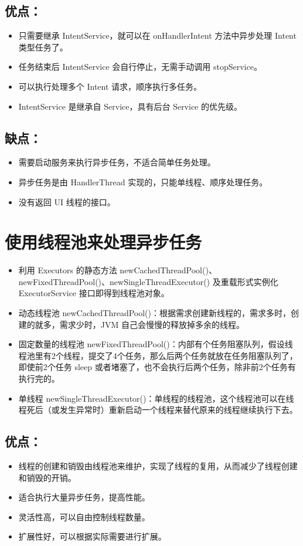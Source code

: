\documentclass[9pt, b5paper]{article}
\begin{document}
\subsection{优点：}
\label{sec-5-1}
\begin{itemize}
\item 只需要继承 IntentService，就可以在 onHandlerIntent 方法中异步处理 Intent 类型任务了。
\item 任务结束后 IntentService 会自行停止，无需手动调用 stopService。
\item 可以执行处理多个 Intent 请求，顺序执行多任务。
\item IntentService 是继承自 Service，具有后台 Service 的优先级。
\end{itemize}
\subsection{缺点：}
\label{sec-5-2}
\begin{itemize}
\item 需要启动服务来执行异步任务，不适合简单任务处理。
\item 异步任务是由 HandlerThread 实现的，只能单线程、顺序处理任务。
\item 没有返回 UI 线程的接口。
\end{itemize}

\section{使用线程池来处理异步任务}
\label{sec-6}
\begin{itemize}
\item 利用 Executors 的静态方法 newCachedThreadPool()、newFixedThreadPool()、newSingleThreadExecutor() 及重载形式实例化 ExecutorService 接口即得到线程池对象。
\item 动态线程池 newCachedThreadPool()：根据需求创建新线程的，需求多时，创建的就多，需求少时，JVM 自己会慢慢的释放掉多余的线程。
\item 固定数量的线程池 newFixedThreadPool()：内部有个任务阻塞队列，假设线程池里有2个线程，提交了4个任务，那么后两个任务就放在任务阻塞队列了，即使前2个任务 sleep 或者堵塞了，也不会执行后两个任务，除非前2个任务有执行完的。
\item 单线程 newSingleThreadExecutor()：单线程的线程池，这个线程池可以在线程死后（或发生异常时）重新启动一个线程来替代原来的线程继续执行下去。
\end{itemize}
\subsection{优点：}
\label{sec-6-1}
\begin{itemize}
\item 线程的创建和销毁由线程池来维护，实现了线程的复用，从而减少了线程创建和销毁的开销。
\item 适合执行大量异步任务，提高性能。
\item 灵活性高，可以自由控制线程数量。
\item 扩展性好，可以根据实际需要进行扩展。
\end{itemize}
\end{document}
